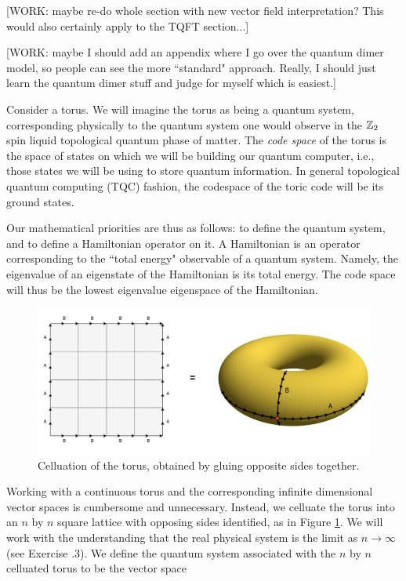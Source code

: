 \documentclass{article}
\theoremstyle{definition}
\numberwithin{figure}{section}
\begin{document}
[WORK: maybe re-do whole section with new vector field interpretation? This would also certainly apply to the TQFT section...]

[WORK: maybe I should add an appendix where I go over the quantum dimer model, so people can see the more ``standard" approach. Really, I should just learn the quantum dimer stuff and judge for myself which is easiest.]

Consider a torus. We will imagine the torus as being a quantum system, corresponding physically to the quantum system one would observe in the $\mathbb{Z}_2$ spin liquid topological quantum phase of matter. The \textit{code space} of the torus is the space of states on which we will be building our quantum computer, i.e., those states we will be using to store quantum information. In general topological quantum computing (TQC) fashion, the codespace of the toric code will be its ground states.

Our mathematical priorities are thus as follows: to define the quantum system, and to define a Hamiltonian operator on it. A Hamiltonian is an operator corresponding to the ``total energy" observable of a quantum system. Namely, the eigenvalue of an eigenstate of the Hamiltonian is its total energy. The code space will thus be the lowest eigenvalue eigenspace of the Hamiltonian.

\begin{figure}
\begin{center}
\includegraphics[scale=0.25]{torus}
\caption{Celluation of the torus, obtained by gluing opposite sides together.}
\label{fig:torus}
\end{center}
\end{figure}

Working with a continuous torus and the corresponding infinite dimensional vector spaces is cumbersome and unnecessary. Instead, we celluate the torus into an $n$ by $n$ square lattice with opposing sides identified, as in Figure \ref{fig:torus}. We will work with the understanding that the real physical system is the limit as $n\to\infty$ (see Exercise \thesection.3). We define the quantum system associated with the $n$ by $n$ celluated torus to be the vector space
\end{document}
